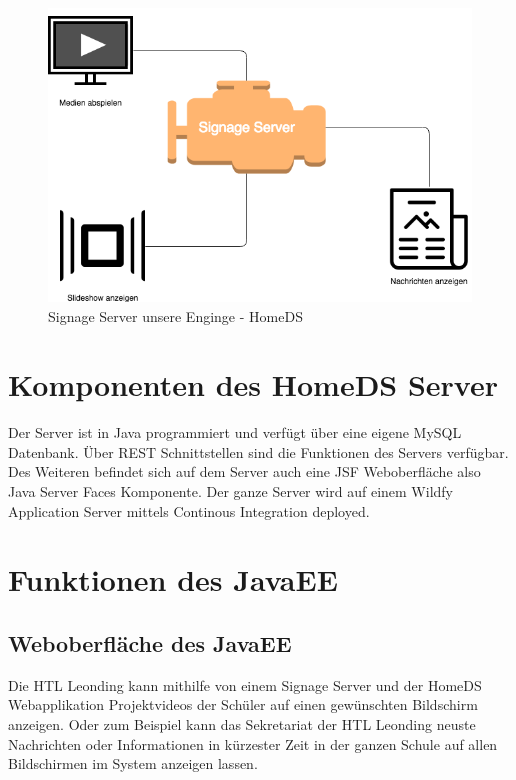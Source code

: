 \begin{figure}[H]
\centering
\includegraphics[width=1\textwidth]{images/08_HomeDsWeb/SignageEngine.png}
\caption{Signage Server unsere Enginge - HomeDS}
\label{img:xiboengine}
\end{figure}
 
\section{Komponenten des HomeDS Server}\label{sec:homedscomponents}
Der Server ist in Java programmiert und verfügt über eine eigene MySQL Datenbank. Über REST Schnittstellen sind die Funktionen des Servers verfügbar. Des Weiteren befindet sich auf dem Server auch eine JSF Weboberfläche also Java Server Faces Komponente. Der ganze Server wird auf einem Wildfy Application Server mittels Continous Integration deployed. 
 
\section{Funktionen des JavaEE}
\subsection{Weboberfläche des JavaEE}\label{sec:javaeejsfweb}
Die HTL Leonding kann mithilfe von einem Signage Server und der HomeDS Webapplikation Projektvideos der Schüler auf einen gewünschten Bildschirm anzeigen. Oder zum Beispiel kann das Sekretariat der HTL Leonding neuste Nachrichten oder Informationen in kürzester Zeit in der ganzen Schule auf allen Bildschirmen im System anzeigen lassen.

